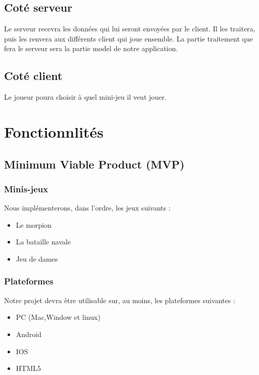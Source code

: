 \documentclass{report}
\begin{document}
\section{Coté serveur}
Le serveur recevra les données qui lui seront envoyées par le client. Il les traitera, puis les renvera aux différents client qui joue ensemble. La partie traitement que fera le serveur
sera la partie \og model \fg{} de notre application.
\section{Coté client}
Le joueur poura choisir à quel mini-jeu il veut jouer.
\chapter{Fonctionnlités}
\section{Minimum Viable Product (MVP)}
\subsection{Minis-jeux}
Nous implémenterons, dans l’ordre, les jeux suivants :
\begin{itemize}
	\item Le morpion
    \item La bataille navale
    \item Jeu de dames
\end{itemize}
\subsection{Plateformes}
Notre projet devra être utilisable sur, au moins, les plateformes suivantes :
\begin{itemize}
	\item PC (Mac,Window et linux)
    \item Android
    \item IOS
    \item HTML5
\end{itemize}
\end{document}
